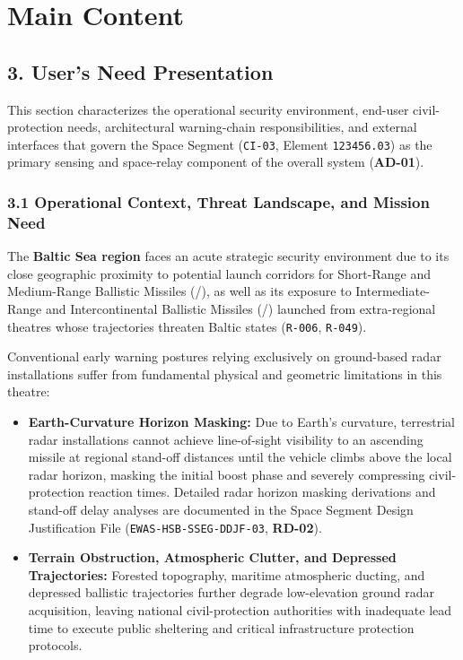 \section{Main Content}

\subsection{3. User's Need Presentation}

This section characterizes the operational security environment, end-user civil-protection needs, architectural warning-chain responsibilities, and external interfaces that govern the  Space Segment (\texttt{CI-03},  Element \texttt{123456.03}) as the primary sensing and space-relay component of the overall  system (\textbf{AD-01}).

\subsubsection{3.1 Operational Context, Threat Landscape, and Mission Need}

The \textbf{Baltic Sea region} faces an acute strategic security environment due to its close geographic proximity to potential launch corridors for Short-Range and Medium-Range Ballistic Missiles (/), as well as its exposure to Intermediate-Range and Intercontinental Ballistic Missiles (/) launched from extra-regional theatres whose trajectories threaten Baltic states (\texttt{R-006}, \texttt{R-049}).

Conventional early warning postures relying exclusively on ground-based radar installations suffer from fundamental physical and geometric limitations in this theatre:
\begin{itemize}
    \item \textbf{Earth-Curvature Horizon Masking:} Due to Earth's curvature, terrestrial radar installations cannot achieve line-of-sight visibility to an ascending missile at regional stand-off distances until the vehicle climbs above the local radar horizon, masking the initial boost phase and severely compressing civil-protection reaction times. Detailed radar horizon masking derivations and stand-off delay analyses are documented in the Space Segment Design Justification File (\texttt{EWAS-HSB-SSEG-DDJF-03}, \textbf{RD-02}).
    \item \textbf{Terrain Obstruction, Atmospheric Clutter, and Depressed Trajectories:} Forested topography, maritime atmospheric ducting, and depressed ballistic trajectories further degrade low-elevation ground radar acquisition, leaving national civil-protection authorities with inadequate lead time to execute public sheltering and critical infrastructure protection protocols.
\end{itemize}

